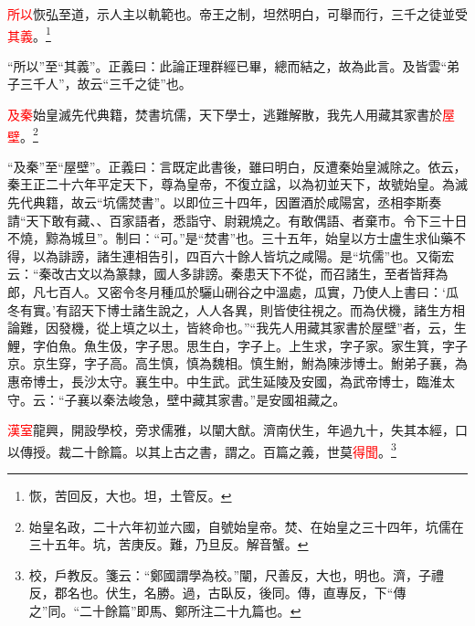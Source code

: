 \textcolor{red}{所以}恢弘至道，示人主以軌範也。帝王之制，坦然明白，可舉而行，三千之徒並受\textcolor{red}{其義}。\footnote{恢，苦回反，大也。坦，土管反。}

{\noindent\shu{}\fzkt “所以”至“其義”。正義曰：此論正理群經已畢，總而結之，故為此言。及皆雲“弟子三千人”，故云“三千之徒”也。 \par}

\textcolor{red}{及秦}始皇滅先代典籍，焚書坑儒，天下學士，逃難解散，我先人用藏其家書於\textcolor{red}{屋壁}。\footnote{始皇名政，二十六年初並六國，自號始皇帝。焚、在始皇之三十四年，坑儒在三十五年。坑，苦庚反。難，乃旦反。解音蟹。}

{\noindent\shu{}\fzkt “及秦”至“屋壁”。正義曰：言既定此書後，雖曰明白，反遭秦始皇滅除之。依云，秦王正二十六年平定天下，尊為皇帝，不復立諡，以為初並天下，故號始皇。為滅先代典籍，故云“坑儒焚書”。以即位三十四年，因置酒於咸陽宮，丞相李斯奏請“天下敢有藏、、百家語者，悉詣守、尉親燒之。有敢偶語、者棄市。令下三十日不燒，黥為城旦”。制曰：“可。”是“焚書”也。三十五年，始皇以方士盧生求仙藥不得，以為誹謗，諸生連相告引，四百六十餘人皆坑之咸陽。是“坑儒”也。又衛宏云：“秦改古文以為篆隸，國人多誹謗。秦患天下不從，而召諸生，至者皆拜為郎，凡七百人。又密令冬月種瓜於驪山硎谷之中溫處，瓜實，乃使人上書曰：‘瓜冬有實。’有詔天下博士諸生說之，人人各異，則皆使往視之。而為伏機，諸生方相論難，因發機，從上填之以土，皆終命也。”“我先人用藏其家書於屋壁”者，云，生鯉，字伯魚。魚生伋，字子思。思生白，字子上。上生求，字子家。家生箕，字子京。京生穿，字子高。高生慎，慎為魏相。慎生鮒，鮒為陳涉博士。鮒弟子襄，為惠帝博士，長沙太守。襄生中。中生武。武生延陵及安國，為武帝博士，臨淮太守。云：“子襄以秦法峻急，壁中藏其家書。”是安國祖藏之。 \par}

\textcolor{red}{漢室}龍興，開設學校，旁求儒雅，以闡大猷。濟南伏生，年過九十，失其本經，口以傳授。裁二十餘篇。以其上古之書，謂之。百篇之義，世莫\textcolor{red}{得聞}。\footnote{校，戶教反。箋云：“鄭國謂學為校。”闡，尺善反，大也，明也。濟，子禮反，郡名也。伏生，名勝。過，古臥反，後同。傳，直專反，下“傳之”同。“二十餘篇”即馬、鄭所注二十九篇也。}

